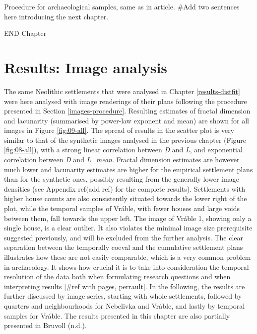 \documentclass[
  12pt,
]{book}
\begin{document}
Procedure for archaeological samples, same as in article. \#Add two sentences here introducing the next chapter.

END Chapter

\hypertarget{images-results}{%
\chapter{Results: Image analysis}\label{images-results}}

The same Neolithic settlements that were analysed in Chapter \ref{results-distfit} were here analysed with image renderings of their plans following the procedure presented in Section \ref{images-procedure}. Resulting estimates of fractal dimension and lacunarity (summarised by power-law exponent and mean) are shown for all images in Figure \ref{fig:09-all}. The spread of results in the scatter plot is very similar to that of the synthetic images analysed in the previous chapter (Figure \ref{fig:08-all}), with a strong linear correlation between \emph{D} and \emph{L}, and exponential correlation between \emph{D} and \emph{L\_mean}. Fractal dimension estimates are however much lower and lacunarity estimates are higher for the empirical settlement plans than for the synthetic ones, possibly resulting from the generally lower image densities (see Appendix ref(add ref) for the complete results). Settlements with higher house counts are also consistently situated towards the lower right of the plot, while the temporal samples of Vráble, with fewer houses and large voids between them, fall towards the upper left. The image of Vráble 1, showing only a single house, is a clear outlier. It also violates the minimal image size prerequisite suggested previously, and will be excluded from the further analysis. The clear separation between the temporally coeval and the cumulative settlement plans illustrates how these are not easily comparable, which is a very common problem in archaeology. It shows how crucial it is to take into consideration the temporal resolution of the data both when formulating research questions and when interpreting results {[}\#ref with pages, perrault{]}. In the following, the results are further discussed by image series, starting with whole settlements, followed by quarters and neighbourhoods for Nebelivka and Vráble, and lastly by temporal samples for Vráble. The results presented in this chapter are also partially presented in Bruvoll (n.d.).
\end{document}
